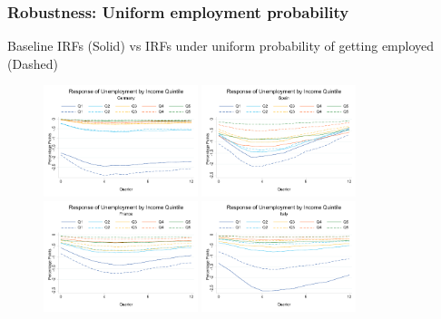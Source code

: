\documentclass[pdflatex,aspectratio=169]{beamer}
\begin{document}
\begin{frame}\frametitle{\bf Robustness: Uniform employment probability \hypertarget{UniformEmpProb}{}}
{\scriptsize Baseline IRFs (Solid) vs IRFs under uniform probability of getting employed (Dashed) \hyperlink{Robust}{}}

\begin{figure}
\begin{center}
\includegraphics[width=0.40\textwidth]{./figures/UR_chart_DE_compare_uni}
\includegraphics[width=0.40\textwidth]{./figures/UR_chart_ES_compare_uni}\\
\includegraphics[width=0.40\textwidth]{./figures/UR_chart_FR_compare_uni}
\includegraphics[width=0.40\textwidth]{./figures/UR_chart_IT_compare_uni}
\end{center}
\end{figure}
\end{frame}
\end{document}
